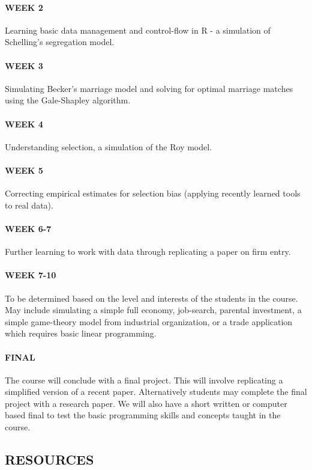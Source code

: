\documentclass{scrartcl}
\begin{document}
\paragraph{WEEK 2}
Learning basic data management and control-flow in R - a simulation of Schelling's segregation model.


\paragraph{WEEK 3}
Simulating Becker's marriage model and solving for optimal marriage matches using the Gale-Shapley algorithm.

\paragraph{WEEK 4}
Understanding selection, a simulation of the Roy model.

\paragraph{WEEK 5}
Correcting empirical estimates for selection bias (applying recently learned tools to real data).

\paragraph{WEEK 6-7}
Further learning to work with data through replicating a paper on firm entry. 

\paragraph{WEEK 7-10}
To be determined based on the level and interests of the students in the course. May include simulating a simple full economy, job-search, parental investment, a simple game-theory model from industrial organization, or a trade application which requires basic linear programming. 

\paragraph{FINAL}
The course will conclude with a final project. This will involve replicating a simplified version of a recent paper. Alternatively students may complete the final project with a research paper. We will also have a short written or computer based final to test the basic programming skills and concepts taught in the course. 

\subsection*{RESOURCES}
\end{document}

